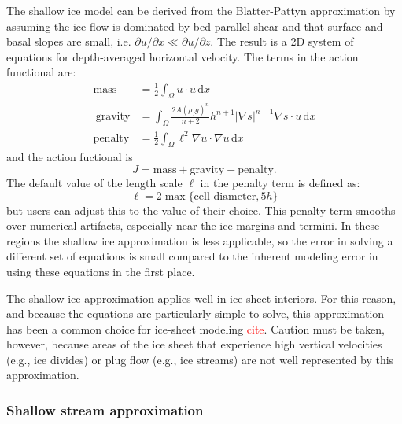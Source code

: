 \documentclass{article}
\theoremstyle{definition}
\theoremstyle{plain}
\newcommand{\ud}{\hspace{2pt}\mathrm{d}}
\begin{document}
The shallow ice model can be derived from the Blatter-Pattyn approximation by assuming the ice flow is dominated by bed-parallel shear and that surface and basal slopes are small, i.e. $\partial u/\partial x \ll \partial u/\partial z$.
The result is a 2D system of equations for depth-averaged horizontal velocity.
The terms in the action functional are:
\begin{align}
    \text{mass} & =\frac{1}{2}\int_\Omega u\cdot u\ud x\\\
    \text{gravity} & = \int_\Omega\frac{2A(\rho_I g)^n}{n+2} h^{n + 1}|\nabla s|^{n - 1}\nabla s\cdot u\ud x\\
    \text{penalty} & = \frac{1}{2}\int_\Omega \ell^2\nabla u\cdot \nabla u\ud x
\end{align}
and the action fuctional is
\begin{equation}
    J = \text{mass} + \text{gravity} + \text{penalty}.
\end{equation}
The default value of the length scale $\ell$ in the penalty term is defined as:
\begin{equation}
    \ell = 2\max\{\text{cell diameter}, 5h\}
\end{equation}
but users can adjust this to the value of their choice.
This penalty term smooths over numerical artifacts, especially near the ice margins and termini.
In these regions the shallow ice approximation is less applicable, so the error in solving a different set of equations is small compared to the inherent modeling error in using these equations in the first place.

The shallow ice approximation applies well in ice-sheet interiors.
For this reason, and because the equations are particularly simple to solve, this approximation has been a common choice for ice-sheet modeling \textcolor{red}{cite}.
Caution must be taken, however, because areas of the ice sheet that experience high vertical velocities (e.g., ice divides) or plug flow (e.g., ice streams) are not well represented by this approximation.

\subsubsection{Shallow stream approximation}
\end{document}
